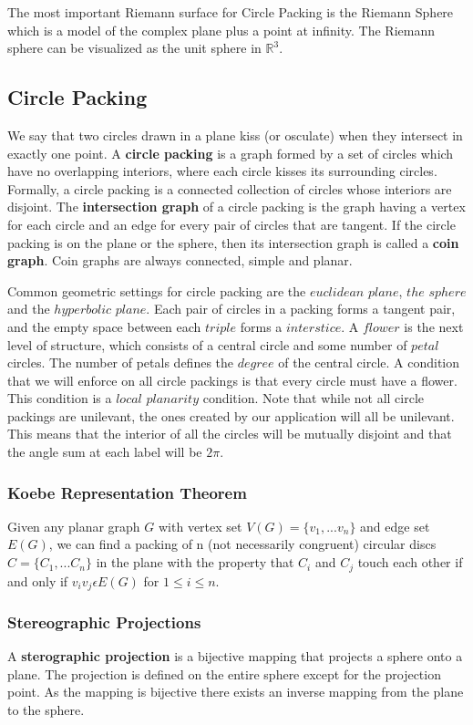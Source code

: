 \documentclass{article}
\begin{document}
  The most important Riemann surface for Circle Packing is the Riemann Sphere which is a model of the complex plane plus a point at infinity. The Riemann sphere can be visualized as the unit sphere in $\mathbb{R}^3$. 
 \subsection{Circle Packing}
  We say that two circles drawn in a plane kiss (or osculate) when they intersect in exactly one point. 
  A \textbf{circle packing} is a graph formed by a set of circles which have no overlapping interiors, where each circle kisses its surrounding circles. 
  Formally, a circle packing is a connected collection of circles whose interiors are disjoint. 
  The \textbf{intersection graph} of a circle packing is the graph having a vertex for each circle and an edge for every pair of circles that are tangent. 
  If the circle packing is on the plane or the sphere, then its intersection graph is called a \textbf{coin graph}. 
  Coin graphs are always connected, simple and planar. 

    Common geometric settings for circle packing are the $euclidean$ $plane$, $the$ $sphere$ and the $hyperbolic$ $plane$. Each pair of circles in a packing forms a tangent pair, and the empty space between each $triple$ forms a $interstice$. A $flower$ is the next level of structure, which consists of a central circle and some number of $petal$ circles. The number of petals defines the $degree$ of the central circle. A condition that we will enforce on all circle packings is that every circle must have a flower. This condition is a $local$ $planarity$ condition. \citep{introCirlceacking} Note that while not all circle packings are unilevant, the ones created by our application will all be unilevant. This means that the interior of all the circles will be mutually disjoint and that the angle sum at each label will be $2\pi$.
    \subsubsection{Koebe Representation Theorem}
    Given any planar graph $G$ with vertex set $V(G) = \{v_1, ... v_n \}$ and edge set $E(G)$, we can find a packing of n (not necessarily congruent) circular discs $C= \{C_1,... C_n\}$ in the plane with the property that $C_i$ and $C_j$ touch each other if and only if $v_i v_j \epsilon E(G)$ for $1 \le i \le n$. \citep{combinatorialGeometry} 
    \subsubsection{Stereographic Projections}
    A \textbf{sterographic projection} is a bijective mapping that projects a sphere onto a plane.
     The projection is defined on the entire sphere except for the projection point. 
    As the mapping is bijective there exists an inverse mapping from the plane to the sphere.
\end{document}
